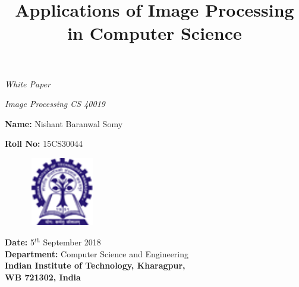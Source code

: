 \documentclass[11pt]{article}
\begin{document}
\title{Applications of Image Processing in Computer Science}

\date{}
\maketitle
\thispagestyle{empty}

{\centering \textit {\large White Paper}\par}

\vspace{0.5cm}
{\centering \textit{\large Image Processing CS 40019}\par}
%

\vspace{5.5cm}

{\centering \large{\textbf{Name:} Nishant Baranwal Somy}\par}

{\centering \large{\textbf{Roll No:} 15CS30044}\par}

\vspace{2.0cm}

\begin{figure}[h]
	\centering
	\includegraphics[height=3cm,width=3cm]{IIT_Logo.png}
\end{figure}


\begin{center}
	{   
	    \textbf{Date:} 5$^{th}$ September 2018 \\
		\textbf{Department:} Computer Science and Engineering \\
		\textbf{Indian Institute of Technology, Kharagpur,}\\
		\textbf {WB 721302, India}\\
	}
\end{center}
\newpage
\tableofcontents
\end{document}
